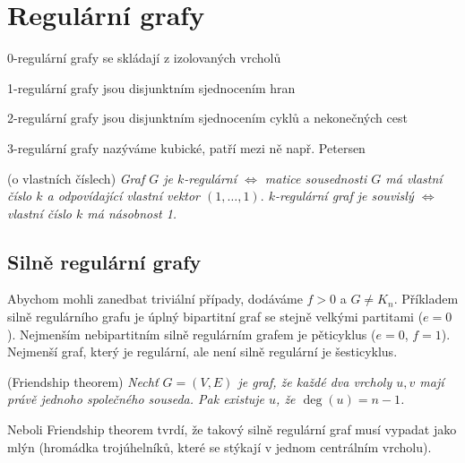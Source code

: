 \section{Regulární grafy}

\begin{itemize*}
\item 0-regulární grafy se skládají z izolovaných vrcholů
\item 1-regulární grafy jsou disjunktním sjednocením hran
\item 2-regulární grafy jsou disjunktním sjednocením cyklů a nekonečných cest
\item 3-regulární grafy nazýváme kubické, patří mezi ně např. Petersen
\end{itemize*}

\vt (o vlastních číslech) {\it Graf $G$ je $k$-regulární $\Leftrightarrow$ matice sousednosti $G$ má vlastní číslo $k$ a odpovídající vlastní vektor $(1,\dots,1).$
$k$-regulární graf je souvislý $\Leftrightarrow$ vlastní číslo $k$ má násobnost 1.}

\subsection{Silně regulární grafy}

Abychom mohli zanedbat triviální případy, dodáváme $f>0$ a $G\neq K_n$.
Příkladem silně regulárního grafu je úplný bipartitní graf se stejně velkými
partitami ($e=0$). Nejmenším nebipartitním silně regulárním grafem je
pěticyklus ($e=0$, $f=1$). Nejmenší graf, který je regulární, ale není silně
regulární je šesticyklus.

\vt (Friendship theorem) {\it Nechť $G=(V,E)$ je graf, že každé dva vrcholy $u,v$ mají právě jednoho společného souseda. Pak existuje $u$, že $\deg(u) = n-1$.}

Neboli Friendship theorem tvrdí, že takový silně regulární graf musí vypadat jako
mlýn (hromádka trojúhelníků, které se stýkají v jednom centrálním vrcholu).

